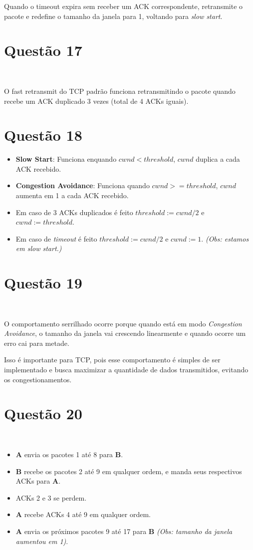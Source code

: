 \documentclass{article}
\begin{document}
Quando o timeout expira sem receber um ACK correspondente,
retransmite o pacote e redefine o tamanho da janela para 1,
voltando para \textit{slow start}.

\section*{Questão 17}\

O fast retransmit do TCP padrão funciona
retransmitindo o pacote quando recebe um ACK duplicado 3 vezes
(total de 4 ACKs iguais).

\newpage
\section*{Questão 18}

\begin{itemize}
    \item \textbf{Slow Start}:
        Funciona enquando \(cwnd < threshold\),
        \(cwnd\) duplica a cada ACK recebido.
    \item \textbf{Congestion Avoidance}:
        Funciona quando \(cwnd >= threshold\),
        \(cwnd\) aumenta em 1 a cada ACK recebido.
    \item Em caso de 3 ACKs duplicados é feito
        \(threshold := cwnd / 2\) e \(cwnd := threshold\).
    \item Em caso de \textit{timeout} é feito
        \(threshold := cwnd / 2\) e \(cwnd := 1\).
        \textit{(Obs: estamos em slow start.)}
\end{itemize}

\section*{Questão 19}\

O comportamento serrilhado ocorre porque
quando está em modo \textit{Congestion Avoidance},
o tamanho da janela vai crescendo linearmente e
quando ocorre um erro cai para metade.

Isso é importante para TCP, pois esse comportamento é
simples de ser implementado e
busca maximizar a quantidade de dados transmitidos,
evitando os congestionamentos.

\section*{Questão 20}\

\begin{itemize}
    \item \textbf{A} envia os pacotes 1 até 8 para \textbf{B}.
    \item \textbf{B} recebe os pacotes 2 até 9 em qualquer ordem,
        e manda seus respectivos ACKs para \textbf{A}.
    \item ACKs 2 e 3 se perdem.
    \item \textbf{A} recebe ACKs 4 até 9 em qualquer ordem.
    \item \textbf{A} envia os próximos pacotes 9 até 17 para \textbf{B}
        \textit{(Obs: tamanho da janela aumentou em 1)}.
\end{itemize}
\end{document}
